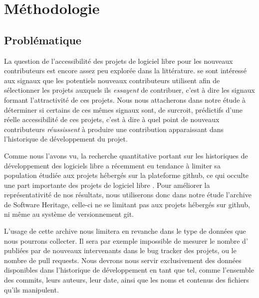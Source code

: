 \chapter{Méthodologie}

\newtheorem{hypo}{Hypothèse}
\newcommand{\newhyp}[2]{%
    \begin{restatable}{hypothesis}{#1}
        \label{hyp:#1}#2
    \end{restatable}%
}

\section{Problématique}

La question de l'accessibilité des projets de logiciel libre pour les nouveaux contributeurs est encore assez
peu explorée dans la littérature. \textcite{signals-2019} se sont intéressé aux signaux que les potentiels
nouveaux contributeurs utilisent afin de sélectionner les projets auxquels ils \emph{essayent} de contribuer,
c'est à dire les signaux formant l'attractivité de ces projets. Nous nous attacherons dans notre étude à
déterminer si certains de ces mêmes signaux sont, de surcroit, prédictifs d'une réelle accessibilité de ces
projets, c'est à dire à quel point de nouveaux contributeurs \emph{réussissent} à produire une contribution
apparaissant dans l'historique de développement du projet.

Comme nous l'avons vu, la recherche quantitative portant sur les historiques de développement des logiciels
libre a récemment eu tendance à limiter sa population étudiée aux projets hébergés sur la plateforme
\gls{github}, ce qui occulte une part importante des projets de logiciel libre
\parencites{mining-github-2014}{penumbra-oss-2022}. Pour améliorer la représentativité de nos résultats, nous
utiliserons donc dans notre étude l'archive de Software Heritage, celle-ci ne se limitant pas aux projets
hébergés sur \gls{github}, ni même au système de versionnement \gls{git}.

L'usage de cette archive nous limitera en revanche dans le type de données que nous pourrons collecter. Il
sera par exemple impossible de mesurer le nombre d' publiées par de nouveaux intervenants dans le
\gls{bug tracker} des projets, ou le nombre de \glspl{pull request}. Nous devrons nous servir exclusivement
des données disponibles dans l'historique de développement en tant que tel, comme l'ensemble des
\glspl{commit}, leurs auteurs, leur date, ainsi que les noms et contenus des fichiers qu'ils manipulent.

